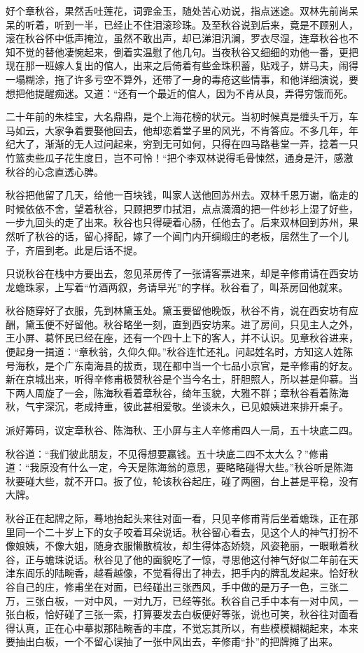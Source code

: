 \documentclass[12pt,UTF8]{ctexbook}
\begin{document}
{{{好个章秋谷，果然舌吐莲花，词霏金玉，随处苦心劝说，指点迷途。双林先前尚呆呆的听着，听到一半，已经止不住泪滚珍珠。及至秋谷说到后来，竟是不顾别人，滚在秋谷怀中低声掩泣，虽然不敢出声，却已涕泪汛澜，罗衣尽湿，连章秋谷也不知不觉的替他凄惋起来，倒着实温慰了他几句。当夜秋谷又细细的劝他一番，更把现在那一班嫁人复出的倌人，出来之后倚着有些金珠积蓄，贴戏子，姘马夫，闹得一塌糊涂，拖了许多亏空不算外，还带了一身的毒疮这些情事，和他详细演说，要想把他提醒痴迷。又道：“还有一个最近的倌人，因为不肯从良，弄得穷饿而死。

二十年前的朱桂宝，大名鼎鼎，是个上海花榜的状元。当初时候真是缠头千万，车马如云，大家争着要娶他回去，他却恋着堂子里的风光，不肯答应。不多几年，年纪大了，渐渐的无人过问起来，穷到无可如何，只得在四马路巷堂一弄，捻着一只竹篮卖些瓜子花生度日，岂不可怜！“把个李双林说得毛骨悚然，通身是汗，感激秋谷的心念直透心脾。

秋谷把他留了几天，给他一百块钱，叫家人送他回苏州去。双林千恩万谢，临走的时候依依不舍，望着秋谷，只顾把罗巾拭泪，点点滴滴的把一件纱衫上湿了好些，一步九回头的走了出来。秋谷也只得硬着心肠，任他去了。后来双林回到苏州，果然听了秋谷的话，留心择配，嫁了一个阊门内开绸缎庄的老板，居然生了一个儿子，齐眉到老。此是后话不提。

只说秋谷在栈中方要出去，忽见茶房传了一张请客票进来，却是辛修甫请在西安坊龙蟾珠家，上写着“竹酒两叙，务请早光”的字样。秋谷看了，叫茶房回他就来。

秋谷随穿好了衣服，先到林黛玉处。黛玉要留他晚饭，秋谷不肯，说在西安坊有应酬，黛玉便不好留他。秋谷略坐一刻，直到西安坊来。进了房间，只见主人之外，王小屏、葛怀民已经在座，还有一个四十上下的客人，并不认识。见章秋谷进来，便起身一揖道：“章秋翁，久仰久仰。”秋谷连忙还礼。问起姓名时，方知这人姓陈号海秋，是个广东南海县的拔贡，现在都中当一个七品小京官，是辛修甫的好友。新在京城出来，听得辛修甫极赞秋谷是个当今名士，肝胆照人，所以甚是仰慕。当下两人周旋了一会，陈海秋看着章秋谷，绮年玉貌，大雅不群；章秋谷看着陈海秋，气宇深沉，老成持重，彼此甚相爱敬。坐谈未久，已见娘姨进来排开桌子。

派好筹码，议定章秋谷、陈海秋、王小屏与主人辛修甫四人一局，五十块底二四。

秋谷道：“我们彼此朋友，不见得想要赢钱。五十块底二四不太大么？”修甫道：“我原没有什么一定，今天是陈海翁的意思，要略略碰得大些。”秋谷听是陈海秋要碰大些，就不开口。扳了位，轮该秋谷起庄，碰了两圈，台上甚是平稳，没有大牌。

秋谷正在起牌之际，蓦地抬起头来往对面一看，只见辛修甫背后坐着蟾珠，正在那里同一个二十岁上下的女子咬着耳朵说话。秋谷留心看去，见这个人的神气打扮不像娘姨，不像大姐，随身衣服懒散梳妆，却生得体态娇娆，风姿艳丽，一眼瞅着秋谷，正与蟾珠说话。秋谷见了他的面貌吃了一惊，寻思他这付神气好似二年前在天津东阎乐的陆畹香，越看越像，不觉看得出了神去，把手内的牌乱发起来。恰好秋谷自己的庄，修甫坐在对面，已经碰出三张西风，手中做的是万子一色，三张二万，三张白板，一对中风，一对九万，已经等张。秋谷自己手中本有一对中风，一张白板，恰好碰了三张一索，打算要发去白板便好等张，说也可笑，秋谷往对面看得认真，正在心中摹拟那陆畹香的丰度，不觉忘其所以，有些模模糊糊起来，本来要抽出白板，一个不留心误抽了一张中风出去，辛修甫“扑”的把牌摊了出来。

}}}
\end{document}
